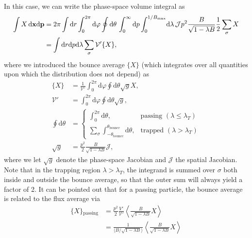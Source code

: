 \documentclass[11pt,a4paper]{article}
\newcommand{\rd}{\ensuremath{\mathrm{d}}}
\newcommand{\sub}[1]{\ensuremath{_{\text{#1}}}}
\renewcommand{\b}[1]{\ensuremath{ {\bf #1 } }}
\begin{document}
In this case, we can write the phase-space volume integral as
\begin{align}
\int X \,\rd\b{x} \rd\b{p} &= 2\pi \int \rd r \int_0^{2\pi} \rd \varphi \oint \rd \theta \, \int_0^\infty \rd p \int_0^{1/B\sub{max}} \!\rd \lambda \, \mathcal{J}p^2\frac{B}{\sqrt{1-\lambda B}}\frac{1}{2}\sum_\sigma X \nonumber \\
&= \int \rd r \rd p \rd \lambda \sum_\sigma \mathcal{V}' \{ X \},
\end{align}
where we introduced the bounce average $\{X\}$ (which integrates over all quantities upon which the distribution does not depend) as
\begin{align}
\{ X\} &= \frac{1}{\mathcal{V}'} \int_0^{2\pi} \rd \varphi \oint \rd \theta \sqrt{g}X, \nonumber \\
\mathcal{V}' &= \int_0^{2\pi} \rd \varphi \oint \rd \theta \sqrt{g}, \nonumber \\
\oint\rd\theta &= \begin{cases}
\int_0^{2\pi}\rd\theta, & \text{passing }(\lambda \leq \lambda_T)\\
\sum_\sigma \int_{-\theta\sub{bounce}}^{\theta\sub{bounce}} \rd\theta, & \text{trapped } (\lambda > \lambda_T)
\end{cases} \\
\sqrt{g} &= \frac{p^2}{2}\frac{B}{\sqrt{1-\lambda B}}\mathcal{J} ,
\end{align}
where we let $\sqrt{g}$ denote the phase-space Jacobian and $\mathcal{J}$ the spatial Jacobian. Note that in the trapping region $\lambda > \lambda_T$, the integrand is summed over $\sigma$ both inside and outside the bounce average, so that the outer sum will always yield a factor of 2.
It can be pointed out that for a passing particle, the bounce average is related to the flux average via 
\begin{align}
\{X\}\sub{passing} &= \frac{p^2}{2}\frac{V'}{\mathcal{V}'}\left\langle \frac{B}{\sqrt{1-\lambda B}}X\right\rangle \nonumber \\
&= \frac{1}{\langle B/\sqrt{1-\lambda B} \rangle}\left\langle \frac{B}{\sqrt{1-\lambda B}}X\right\rangle 
\end{align}
\end{document}
